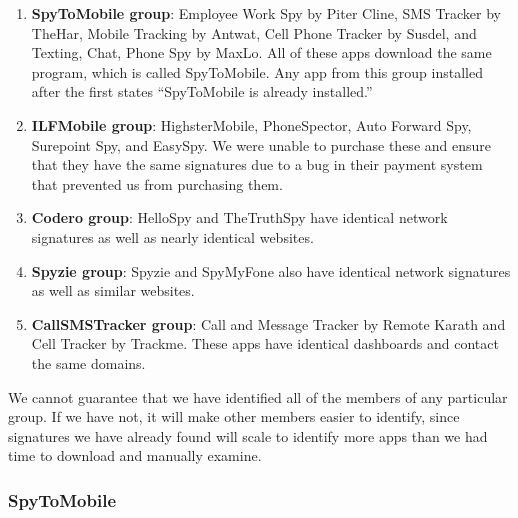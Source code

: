 \documentclass[acmtog]{acmart}
\begin{document}
\begin{enumerate}
	\item \textbf{SpyToMobile group}: Employee Work Spy by Piter Cline, SMS 
	Tracker by TheHar, Mobile Tracking by Antwat, Cell Phone Tracker by Susdel, 
	and Texting, Chat, 
	Phone Spy by MaxLo. All of these apps download the same program, which is 
	called SpyToMobile. Any app from this group installed after the first 
	states ``SpyToMobile is already installed.''
	\item \textbf{ILFMobile group}: HighsterMobile, PhoneSpector, Auto Forward 
	Spy, Surepoint Spy, and EasySpy. We were unable to purchase these and 
	ensure that they have the same signatures due to a bug in their payment 
	system that prevented us from purchasing them.
	\item \textbf{Codero group}: HelloSpy and TheTruthSpy have identical 
	network signatures as well as nearly identical websites.
	\item \textbf{Spyzie group}: Spyzie and SpyMyFone also have identical network signatures 
	as well as similar websites.
	\item \textbf{CallSMSTracker group}: Call and Message Tracker by Remote 
	Karath and Cell Tracker by Trackme. These apps have identical dashboards 
	and contact the same domains.
\end{enumerate}
We cannot guarantee that we have identified all of the members of any 
particular group. If we have not, it will make other members easier to 
identify, since signatures we have already found will scale to identify more 
apps than we had time to download and manually examine.

\subsubsection{SpyToMobile}
\end{document}
